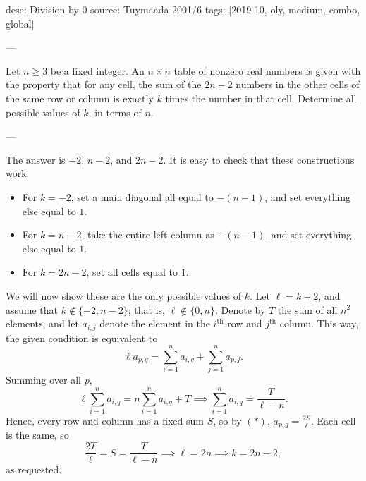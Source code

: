 desc: Division by 0
source: Tuymaada 2001/6
tags: [2019-10, oly, medium, combo, global]

---

Let $n\ge 3$ be a fixed integer. An $n\times n$ table of nonzero real numbers is given with the property that for any cell, the sum of the $2n-2$ numbers in the other cells of the same row or column is exactly $k$ times the number in that cell. Determine all possible values of $k$, in terms of $n$.

---

The answer is $-2$, $n-2$, and $2n-2$. It is easy to check that these constructions work:
\begin{itemize}
    \item For $k=-2$, set a main diagonal all equal to $-(n-1)$, and set everything else equal to $1$.
        \vspace{-0.5em}
    \item For $k=n-2$, take the entire left column as $-(n-1)$, and set everything else equal to $1$.
        \vspace{-0.5em}
    \item For $k=2n-2$, set all cells equal to $1$.
\end{itemize}
We will now show these are the only possible values of $k$. Let $\ell=k+2$, and assume that $k\notin\{-2,n-2\}$; that is, $\ell\notin\{0,n\}$. Denote by $T$ the sum of all $n^2$ elements, and let $a_{i,j}$ denote the element in the $i^\text{th}$ row and $j^\text{th}$ column. This way, the given condition is equivalent to
\begin{equation}\tag{$*$}
    \ell a_{p,q}=\sum_{i=1}^n a_{i,q}+\sum_{j=1}^n a_{p,j}.
\end{equation}
Summing over all $p$, \[\ell\sum_{i=1}^na_{i,q}=n\sum_{i=1}^na_{i,q}+T\implies\sum_{i=1}^na_{i,q}=\frac T{\ell-n}.\]
Hence, every row and column has a fixed sum $S$, so by $(*)$, $a_{p,q}=\tfrac{2S}\ell$. Each cell is the same, so \[\frac{2T}\ell=S=\frac T{\ell-n}\implies\ell=2n\implies k=2n-2,\]
as requested.
